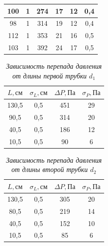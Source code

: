 \documentclass[a4paper, fontsize = 14pt]{article}
\begin{document}
\begin{table}[]
{\begin{tabular}{|c|c|c|c|c|c|}
100                      & 1                      & 274                     & 17                      & 12                     & 0,4                    \\ \hline
98                       & 1                      & 314                     & 19                      & 12                     & 0,4                    \\ \hline
112                      & 1                      & 353                     & 21                      & 16                     & 0,5                    \\ \hline
103                      & 1                      & 392                     & 24                      & 17                     & 0,5                    \\ \hline
\end{tabular}
}
\end{table}

\begin{table}[]
\centering
\caption{\textit{Зависимость перепада давления от длины первой трубки $d_1$}}
\begin{tabular}{|c|c|c|c|}
\hline
\textbf{$L, см$} & \textbf{$\sigma_L, см$} & \textbf{$\Delta P, Па$} & \textbf{$\sigma_P, Па$} \\ \hline
130,5            & 0,5                     & 451                     & 29                       \\ \hline
90,5             & 0,5                     & 314                     & 20                       \\ \hline
40,5             & 0,5                     & 186                     & 12                       \\ \hline
10,5             & 0,5                     & 90                      & 6                       \\ \hline
\end{tabular}
\end{table}

\begin{table}[]
\centering
\caption{\textit{Зависимость перепада давления от длины второй трубки $d_2$}}
\begin{tabular}{|c|c|c|c|}
\hline
\textbf{$L, см$} & \textbf{$\sigma_L, см$} & \textbf{$\Delta P, Па$} & \textbf{$\sigma_P, Па$} \\ \hline
130,5            & 0,5                     & 305 & 20                       \\ \hline
80,5             & 0,5                     & 219 & 14                       \\ \hline
40,5             & 0,5                     & 152 & 10                       \\ \hline
10,5             & 0,5                     & 85 & 6                       \\ \hline
\end{tabular}
\end{table}
\end{document}
